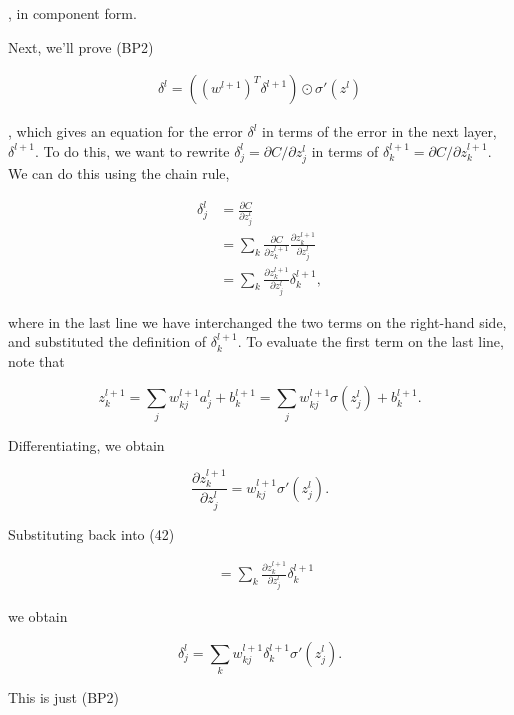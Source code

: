 \noindent, in component form.


Next, we'll prove (BP2)

\begin{align*}
\delta^l = ((w^{l+1})^T \delta^{l+1}) \odot \sigma'(z^l) \nonumber
\end{align*}

\noindent, which gives an equation for the error $\delta^l$ in terms of the error in the next layer, $\delta^{l+1}$. To do this, we want to rewrite $\delta^l_j = \partial C / \partial z^l_j$ in terms of $\delta^{l+1}_k = \partial C / \partial z^{l+1}_k$. We can do this using the chain rule,

\begin{align}
\delta^l_j &= \frac{\partial C}{\partial z^l_j} \tag{40} \\ &= \sum_k \frac{\partial C}{\partial z^{l+1}_k} \frac{\partial z^{l+1}_k}{\partial z^l_j} \tag{41} \\ &= \sum_k \frac{\partial z^{l+1}_k}{\partial z^l_j} \delta^{l+1}_k, \tag{42}
\end{align}

\noindent where in the last line we have interchanged the two terms on the right-hand side, and substituted the definition of $\delta^{l+1}_k$. To evaluate the first term on the last line, note that

\begin{equation}
z^{l+1}_k = \sum_j w^{l+1}_{kj} a^l_j +b^{l+1}_k = \sum_j w^{l+1}_{kj} \sigma(z^l_j) +b^{l+1}_k.
\tag{43}
\end{equation}

\noindent Differentiating, we obtain

\begin{equation}
\frac{\partial z^{l+1}_k}{\partial z^l_j} = w^{l+1}_{kj} \sigma'(z^l_j).
\tag{44}
\end{equation}

\noindent Substituting back into (42)

\begin{align*}
&= \sum_k \frac{\partial z^{l+1}_k}{\partial z^l_j} \delta^{l+1}_k \nonumber
\end{align*}

\noindent we obtain

\begin{equation}
\delta^l_j = \sum_k w^{l+1}_{kj} \delta^{l+1}_k \sigma'(z^l_j).
\tag{45}
\end{equation}

\noindent This is just (BP2)

